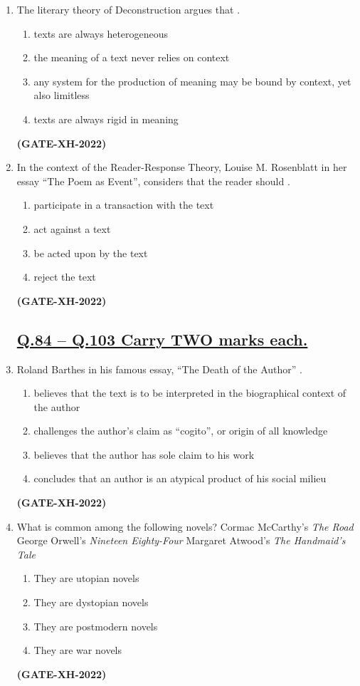 \documentclass[journal]{IEEEtran}
\begin{document}
\begin{enumerate}
\item The literary theory of Deconstruction argues that \underline{\hspace{3cm}}.
\begin{enumerate}
\item texts are always heterogeneous
\item the meaning of a text never relies on context
\item any system for the production of meaning may be bound by context, yet also limitless
\item texts are always rigid in meaning
\end{enumerate}
\hfill\textbf{(GATE-XH-2022)}

\item In the context of the Reader-Response Theory, Louise M. Rosenblatt in her essay ``The Poem as Event'', considers that the reader should \underline{\hspace{3cm}}.
\begin{enumerate}
\item participate in a transaction with the text
\item act against a text
\item be acted upon by the text
\item reject the text
\end{enumerate}
\hfill\textbf{(GATE-XH-2022)}
\subsection*{\underline{\textbf{Q.84 – Q.103 Carry TWO marks each.}}}

\item Roland Barthes in his famous essay, ``The Death of the Author'' \underline{\hspace{3cm}}.
\begin{enumerate}
\item believes that the text is to be interpreted in the biographical context of the author
\item challenges the author’s claim as ``cogito'', or origin of all knowledge
\item believes that the author has sole claim to his work
\item concludes that an author is an atypical product of his social milieu
\end{enumerate}
\hfill\textbf{(GATE-XH-2022)}

\item What is common among the following novels?  
Cormac McCarthy’s \textit{The Road}  
George Orwell’s \textit{Nineteen Eighty-Four}  
Margaret Atwood’s \textit{The Handmaid’s Tale}
\begin{multicols}{2}
\begin{enumerate}
\item They are utopian novels
\item They are dystopian novels
\item They are postmodern novels
\item They are war novels
\end{enumerate}
\end{multicols}
\hfill\textbf{(GATE-XH-2022)}


\end{enumerate}
\end{document}
